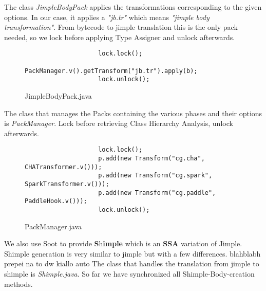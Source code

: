 \documentclass{dithesis}
\begin{document}
	    	The class \textit{JimpleBodyPack} applies the transformations corresponding to the given options. In our case, it applies a \textit{"jb.tr"} which means \textit{"jimple body transformation"}. From bytecode to jimple translation this is the only pack needed, so we lock before applying Type Assigner and unlock afterwards.
	    	\begin{figure}[H]
	            \begin{lstlisting}
			    	lock.lock();
					PackManager.v().getTransform("jb.tr").apply(b);
					lock.unlock();
				\end{lstlisting}
	        \caption{JimpleBodyPack.java}
	        \end{figure}

	    	The class that manages the Packs containing the various phases and their options is \textit{PackManager}. Lock before retrieving Class Hierarchy Analysis, unlock afterwards.
			\begin{figure}[H]
	            \begin{lstlisting}
					lock.lock();
					p.add(new Transform("cg.cha", CHATransformer.v()));
					p.add(new Transform("cg.spark", SparkTransformer.v()));
					p.add(new Transform("cg.paddle", PaddleHook.v()));
					lock.unlock();
				\end{lstlisting}
	        \caption{PackManager.java}
	        \end{figure}

	    	We also use Soot to provide \textbf{S}h\textbf{imple} which is an \textbf{SSA} variation of Jimple. Shimple generation is very similar to jimple but with a few differences. blahblabh prepei na to dw kiallo auto
	    	The class that handles the translation from jimple to shimple is \textit{Shimple.java}. So far we have synchronized all Shimple-Body-creation methods.
\end{document}
